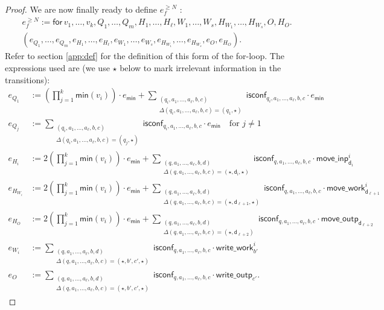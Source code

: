 \begin{proof}
We are now finally ready to define $e_f^{\geq N}$ :
\begin{multline*}
e_f^{\geq N}:= \mathsf{for\,} v_1,\ldots,v_{k},Q_1,\ldots,Q_m,H_1,\ldots,H_\ell,W_1,\ldots,W_s, H_{W_1},\ldots,H_{W_s},O,H_O . \\
(e_{Q_1},\ldots,e_{Q_m},e_{H_1},\ldots,e_{H_\ell},e_{W_1},\ldots,e_{W_s},e_{H_{W_1}},\ldots,e_{H_{W_s}},e_{O}, e_{H_O}).
\end{multline*}
Refer to section \ref{app:def} for the definition of this form of the for-loop. The expressions used are (we use $\star$ below to mark irrelevant information in the transitions):
 \allowdisplaybreaks
\begin{align*}
	e_{Q_1}&:=\left(\prod_{j=1}^{k} \textsf{min}(v_i)\right)\cdot e_{\mathsf{min}}
	+ \sum_{\substack{(q_i,a_1,\ldots,a_\ell,b,c)\\
	\Delta(q_i,a_1,\ldots,a_\ell,b,c)=(q_1,\star)}} \!\!\!\!\!\!\!\!\! \mathsf{isconf}_{q_i,a_1,\ldots,a_\ell,b,c}\cdot e_{\mathsf{min}} \\
	e_{Q_j}&:=\sum_{\substack{(q_i,a_1,\ldots,a_\ell,b,c)\\
	\Delta(q_i,a_1,\ldots,a_\ell,b,c)=(q_j,\star)}} \!\!\!\!\!\!\!\!\! \mathsf{isconf}_{q_i,a_1,\ldots,a_\ell,b,c}\cdot e_{\mathsf{min}}
	 \quad \text{for $j\neq 1$}\\
	e_{H_i}&:=2\left(\prod_{j=1}^{k} \textsf{min}(v_i)\right)\cdot e_{\mathsf{min}}
	+\sum_{\substack{(q,a_1,\ldots,a_\ell,b,d)\\
	\Delta(q,a_1,\ldots,a_\ell,b,c)=(\star,\mathsf{d_i},\star)}}\!\!\!\!\!\!\!\!\! \mathsf{isconf}_{q,a_1,\ldots,a_\ell,b,c}\cdot\mathsf{move\_inp}^i_{\mathsf{d}_i}\\
	e_{H_{W_i}}&:=2\left(\prod_{j=1}^{k} \textsf{min}(v_i)\right)\cdot e_{\mathsf{min}}
	+\sum_{\substack{(q,a_1,\ldots,a_\ell,b,d)\\
	\Delta(q,a_1,\ldots,a_\ell,b,c)=(\star,\mathsf{d_{\ell+1}},\star)}}\!\!\!\!\!\!\!\!\! \mathsf{isconf}_{q,a_1,\ldots,a_\ell,b,c}\cdot\mathsf{move\_work}_{\mathsf{d}_{\ell+1}}^i\\
	e_{H_O}&:=2\left(\prod_{j=1}^{k} \textsf{min}(v_i)\right)\cdot e_{\mathsf{min}}
	+\sum_{\substack{(q,a_1,\ldots,a_\ell,b,d)\\
	\Delta(q,a_1,\ldots,a_\ell,b,c)=(\star,\mathsf{d}_{\ell+2})}}\!\!\!\!\!\!\!\!\! \mathsf{isconf}_{q,a_1,\ldots,a_\ell,b,c}\cdot\mathsf{move\_outp}_{\mathsf{d}_{\ell+2}}\\
	e_{W_i}&:=\sum_{\substack{(q,a_1,\ldots,a_\ell,b,d)\\
	\Delta(q,a_1,\ldots,a_\ell,b,c)=(\star,b',c',\star)}}\!\!\!\!\!\!\!\!\! \mathsf{isconf}_{q,a_1,\ldots,a_\ell,b,c}\cdot\mathsf{write\_work}_{b'}^i\\
	e_{O}&:=\sum_{\substack{(q,a_1,\ldots,a_\ell,b,d)\\
	\Delta(q,a_1,\ldots,a_\ell,b,c)=(\star,b',c',\star)}}\!\!\!\!\!\!\!\!\! \mathsf{isconf}_{q,a_1,\ldots,a_\ell,b,c}\cdot\mathsf{write\_outp}_{c'}.
\end{align*}


\end{proof}
